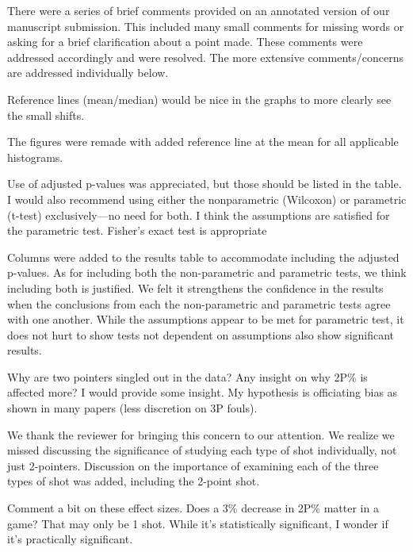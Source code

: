 \documentclass[12pt]{article}
\newenvironment{comment}%
{\begin{quoting}\noindent\small\it\ignorespaces%
  }{\end{quoting}}
\begin{document}
There were a series of brief comments provided on an annotated version of our
manuscript submission. This included many small comments for missing words or 
asking for a brief clarification about a point made. These comments were addressed
accordingly and were resolved. The more extensive comments/concerns are addressed 
individually below.

\begin{comment}
  Reference lines (mean/median) would be nice in the graphs to more clearly
  see the small shifts.
\end{comment}

The figures were remade with added reference line at the mean for all 
applicable histograms.
 
\begin{comment}
Use of adjusted p-values was appreciated, but those should be listed in 
the table.  I would also recommend using either the nonparametric (Wilcoxon)
or parametric (t-test) exclusively—no need for both.  I think the 
assumptions are satisfied for the parametric test.  Fisher’s exact test 
is appropriate
\end{comment}

 Columns were added to the results table to accommodate including the 
 adjusted p-values. As for including both the non-parametric and parametric 
 tests, we think including both is justified. We felt it strengthens the confidence
 in the results when the conclusions from each the non-parametric and parametric 
 tests agree with one another. While the assumptions appear to be met for parametric
 test, it does not hurt to show tests not dependent on assumptions also show
 significant results.
 
\begin{comment}
 Why are two pointers singled out in the data? Any insight on why 2P\% is 
 affected more? I would provide some insight. My hypothesis is officiating 
 bias as shown in many papers (less discretion on 3P fouls). 
\end{comment}

 We thank the reviewer for bringing this concern to our attention. We realize
 we missed discussing the significance of studying each type of shot individually,
 not just 2-pointers. Discussion on the importance of examining each of the three
 types of shot was added, including the 2-point shot.

\begin{comment}
Comment a bit on these effect sizes. Does a 3\% decrease in 2P\% matter in a game?
That may only be 1 shot. While it's statistically significant, I wonder 
if it's practically significant.
\end{comment}
\end{document}
